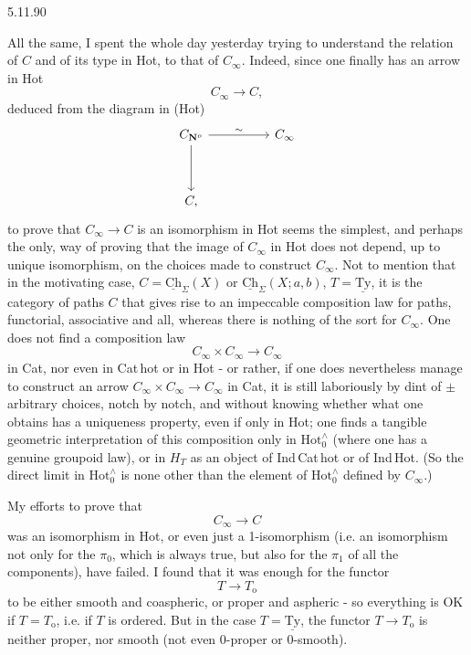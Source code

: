 \documentclass[11pt]{article}
\newcommand{\printedpage}[1]{\marginpar{\footnotesize p.~#1}}
\newcommand{\msp}[1]{\marginpar{\footnotesize [#1]}}
\newcommand{\Hotz}{\mathrm{Hot}^{\wedge}_{0}}
\newcommand{\Ch}{\underline{\mathrm{Ch}}}
\newcommand{\Ty}{\underline{\mathrm{Ty}}}
\newcommand{\CNo}{C_{\mathbf{N}^{o}}}
\begin{document}
\begin{flushright}
{\footnotesize 5.11.90}
\end{flushright}

All the same, I spent the whole day yesterday trying to understand the relation of $C$ and of its type in Hot, to that of $C_{\infty}$. Indeed, since one finally has an arrow in Hot
\[
C_{\infty} \longrightarrow C,
\]
deduced from the diagram in (Hot)
\[
\begin{tikzcd}[column sep=huge, row sep=huge]
\CNo \arrow[r, "\sim"] \arrow[d] & C_{\infty} \\
C, &
\end{tikzcd}
\]
to prove that $C_{\infty} \longrightarrow C$ is an isomorphism in Hot
\msp{page 111}
seems the simplest, and perhaps the only, way of proving that the image of $C_{\infty}$ in Hot does not depend, up to unique isomorphism, on the choices made to construct $C_{\infty}$. Not to mention that in the motivating case, $C = \Ch_{\Sigma}(X)$ or $\Ch_{\Sigma}(X;a,b)$, $T = \Ty$, it is the category of paths $C$ that gives rise to an impeccable composition law for paths, functorial, associative and all, whereas there is nothing of the sort for $C_{\infty}$. One does not find a composition law
\[
C_{\infty} \times C_{\infty} \longrightarrow C_{\infty}
\]
in Cat, nor even in Cat\,hot or in Hot - or rather, if one does nevertheless manage to construct an arrow $C_{\infty} \times C_{\infty} \longrightarrow C_{\infty}$ in Cat, it is still laboriously by dint of $\pm$ arbitrary choices, notch by notch, and without knowing whether what one obtains has a uniqueness property, even if only in Hot; one finds a tangible geometric interpretation of this composition only in $\Hotz$ (where one has a genuine groupoid law), or in $H_{T}$ as an object of Ind\,Cat\,hot
\printedpage{71}
\msp{page 112}
or of Ind\,Hot. (So the direct limit in $\Hotz$ is none other than the element of $\Hotz$ defined by $C_{\infty}$.)

My efforts to prove that
\[
C_{\infty} \longrightarrow C
\]
was an isomorphism in Hot, or even just a 1-isomorphism (i.e. an isomorphism not only for the $\pi_{0}$, which is always true, but also for the $\pi_{1}$ of all the components), have failed. I found that it was enough for the functor %
\[
T \longrightarrow T_{\mathrm{o}}
\]
to be either smooth and coaspheric, or proper and aspheric - so everything is OK if $T = T_{\mathrm{o}}$, i.e. if $T$ is ordered. But in the case $T = \Ty$, the functor $T \longrightarrow T_{\mathrm{o}}$ is neither proper, nor smooth (not even 0-proper or 0-smooth).
\end{document}
